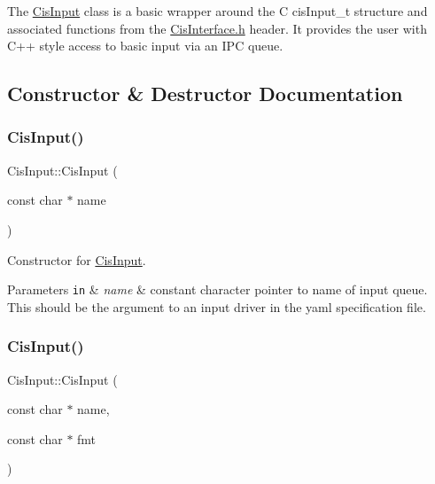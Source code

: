 The \mbox{\hyperlink{classCisInput}{Cis\+Input}} class is a basic wrapper around the C cis\+Input\+\_\+t structure and associated functions from the \mbox{\hyperlink{CisInterface_8h_source}{Cis\+Interface.\+h}} header. It provides the user with C++ style access to basic input via an I\+PC queue. 

\subsection{Constructor \& Destructor Documentation}
\mbox{\label{classCisInput_a5a81811ecb4ea9b3d786ea60522cdcb7}} 
\subsubsection{\texorpdfstring{Cis\+Input()}{CisInput()}\hspace{0.1cm}{\footnotesize\ttfamily [1/2]}}
{\footnotesize\ttfamily Cis\+Input\+::\+Cis\+Input (\begin{DoxyParamCaption}\item[{const char $\ast$}]{name }\end{DoxyParamCaption})\hspace{0.3cm}{\ttfamily [inline]}}



Constructor for \mbox{\hyperlink{classCisInput}{Cis\+Input}}. 


\begin{DoxyParams}[1]{Parameters}
\mbox{\tt in}  & {\em name} & constant character pointer to name of input queue. This should be the argument to an input driver in the yaml specification file. \\
\hline
\end{DoxyParams}
\mbox{\label{classCisInput_ad39b94867de8741606bef7f1acdcbfd2}} 
\subsubsection{\texorpdfstring{Cis\+Input()}{CisInput()}\hspace{0.1cm}{\footnotesize\ttfamily [2/2]}}
{\footnotesize\ttfamily Cis\+Input\+::\+Cis\+Input (\begin{DoxyParamCaption}\item[{const char $\ast$}]{name,  }\item[{const char $\ast$}]{fmt }\end{DoxyParamCaption})\hspace{0.3cm}{\ttfamily [inline]}}



